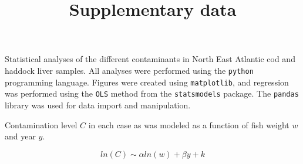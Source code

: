\documentclass[11pt]{article}
\title{Supplementary data}
\author{}
\date{}
\begin{document}
\maketitle

Statistical analyses of the different contaminants in North East
Atlantic cod and haddock liver samples.  All analyses were performed
using the \texttt{python} programming language.  Figures were created
using \texttt{matplotlib}, and regression was performed using the
\texttt{OLS} method from the \texttt{statsmodels} package.  The
\texttt{pandas} library was used for data import and manipulation.

Contamination level $C$ in each case as was modeled as a function of
fish weight $w$ and year $y$.

\begin{equation*}
ln(C) \sim \alpha ln(w) + \beta y + k
\end{equation*}
\end{document}
